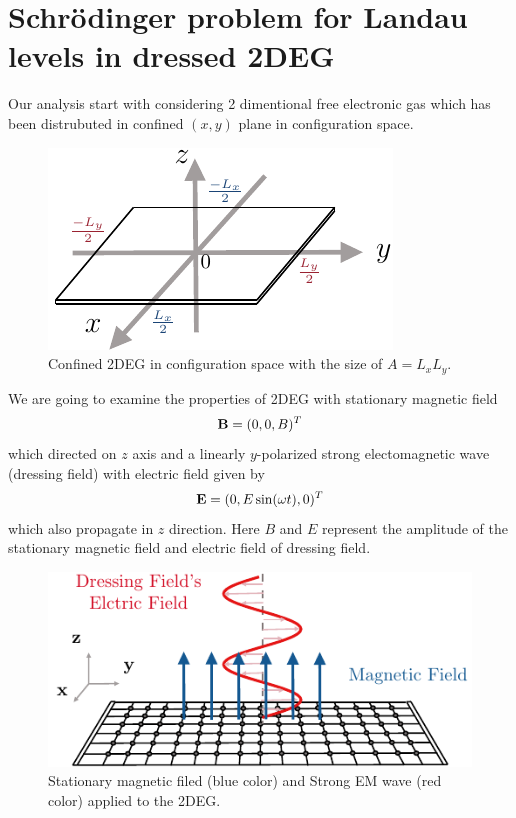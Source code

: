 \section{Schrödinger problem for Landau levels in dressed 2DEG}

Our analysis start with considering 2 dimentional free electronic gas which has been distrubuted in confined $(x,y)$ plane in configuration space.
\begin{figure}[ht!]
  \centering
  \includegraphics[scale=0.9]{figures/fig0.pdf}
  \caption{Confined 2DEG in configuration space with the size of $A=L_xL_y$.}
  \label{fig:1.0}
\end{figure}

\noindent
We are going to examine the properties of 2DEG with stationary magnetic field
\begin{equation} \label{1.1}
  \vb{B} = (0,0,B)^T
\end{equation}
which directed on $z$ axis and a linearly $y$-polarized strong electomagnetic wave (dressing field) with electric field given by
\begin{equation} \label{1.2}
  \vb{E} = (0,E\sin(\omega t),0)^T
\end{equation}
which also propagate in $z$ direction. Here $B$ and $E$ represent the amplitude of the stationary magnetic field and electric field of dressing field.
\begin{figure}[ht!]
  \centering
  \includegraphics[scale=0.9]{figures/fig1.pdf}
  \caption{Stationary magnetic filed (blue color) and Strong EM wave (red color) applied to the 2DEG.}
  \label{fig:1.1}
\end{figure}

